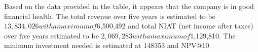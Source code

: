 

Based on the data provided in the table, it appears that the company is in good financial health. The total revenue over five years is estimated to be $13,834,026 with a maximum of $6,500,492 and total NIAT (net income after taxes) over five years estimated to be $2,069,283 with a maximum of $1,129,810. The minimum investment needed is estimated at 148353 and NPV@10%